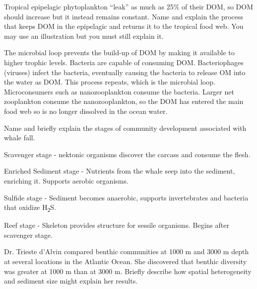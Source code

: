 \documentclass[11pt]{exam}
\begin{document}
\begin{questions}
\question[10]
Tropical epipelagic phytoplankton “leak” as much as 25\% of their DOM, so DOM should increase but it instead remains constant. Name and explain the process that keeps DOM in the epipelagic and returns it to the tropical food web. You may use an illustration but you must still explain it. 

\begin{minipage}[t][2in]{\textwidth}%
\begin{solution}
The microbial loop prevents the build-up of DOM by making it available to higher trophic levels. Bacteria are capable of consuming DOM.  Bacteriophages (viruses) infect the bacteria, eventually causing the bacteria to release OM into the water as DOM. This process repeats, which is the microbial loop.  Microconsumers such as nanozooplankton consume the bacteria. Larger net zooplankton consume the nanozooplankton, so the DOM has entered the main food web so is no longer dissolved in the ocean water.
\end{solution}%
\end{minipage}

\newpage

\question[10]
Name and briefly explain the stages of community development associated with whale fall.

\begin{minipage}[t][4in]{\textwidth}%
\begin{solution}
Scavenger stage - nektonic organisms discover the carcass and consume the flesh. \vspace{0.5\baselineskip}

Enriched Sediment stage - Nutrients from the whale seep into the sediment, enriching it. Supports aerobic organisms.\vspace{0.5\baselineskip}

Sulfide stage - Sediment becomes anaerobic, supports invertebrates and bacteria that oxidize H\textsubscript{2}S.\vspace{0.5\baselineskip}

Reef stage - Skeleton provides structure for sessile organisms. Begins after scavenger stage.
\end{solution}
\end{minipage}

\question[10]
Dr. Trieste d’Alvin compared benthic communities at 1000 m and 3000 m depth at several locations in the Atlantic Ocean.  She discovered that benthic diversity was greater at 1000 m than at 3000 m. Briefly describe how spatial heterogeneity and sediment size might explain her results. 


\end{questions}
\end{document}
